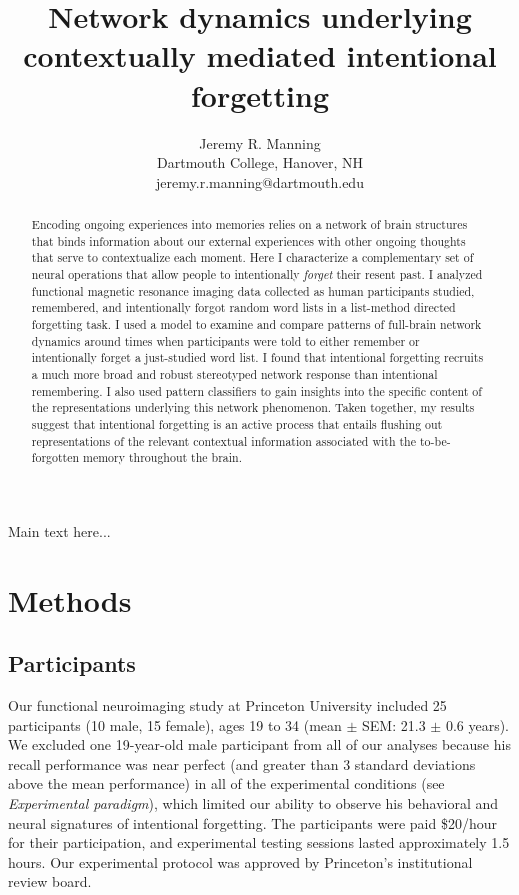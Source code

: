 \documentclass[11pt]{article}
\title{Network dynamics underlying contextually mediated intentional forgetting}
\author{Jeremy R. Manning\\Dartmouth College, Hanover, NH\\jeremy.r.manning@dartmouth.edu}
\begin{document}
\maketitle

\begin{abstract}
Encoding ongoing experiences into memories relies on a network of brain
structures that binds information about our external experiences with
other ongoing thoughts that serve to contextualize each moment.  Here
I characterize a complementary set of neural operations that allow people
to intentionally \textit{forget} their resent past.  I analyzed
functional magnetic resonance imaging data collected as human
participants studied, remembered, and intentionally forgot random word
lists in a list-method directed forgetting task.  I used a model to
examine and compare patterns of full-brain network dynamics around
times when participants were told to either remember or intentionally forget a
just-studied word list.  I found that intentional forgetting recruits
a much more broad and robust stereotyped network response than
intentional remembering.  I also used pattern classifiers to gain
insights into the specific content of the representations underlying
this network phenomenon.  Taken together, my results suggest that intentional
forgetting is an active process that entails flushing out
representations of the relevant contextual information associated with
the to-be-forgotten memory throughout the brain.
\end{abstract}

Main text here...

\section*{Methods}
\subsection*{Participants}
Our functional neuroimaging study at Princeton University
included 25 participants (10 male, 15 female), ages 19 to 34 (mean
$\pm$ SEM: 21.3 $\pm$ 0.6 years).  We excluded one 19-year-old male
participant from all of our analyses because his recall performance
was near perfect (and greater than 3 standard deviations above the
mean performance) in all of the experimental conditions (see
\textit{Experimental paradigm}), which limited our ability to observe
his behavioral and neural signatures of intentional forgetting.  The
participants were paid \$20/hour for their participation, and
experimental testing sessions lasted approximately 1.5 hours.  Our
experimental protocol was approved by Princeton's institutional review
board.
\end{document}
